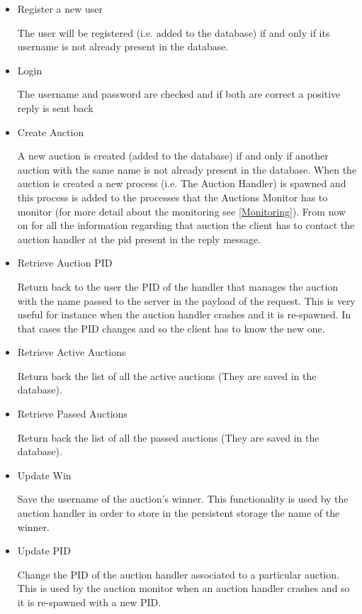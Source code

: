 \begin{itemize}
	\item Register a new user
	
	\noindent The user will be registered (i.e. added to the database) if and only if its username is not already present in the database.
	
	\item Login
	
	\noindent The username and password are checked and if both are correct a positive reply is sent back
	
	\item Create Auction
	
	\noindent A new auction is created (added to the database) if and only if another auction with the same name is not already present in the database. When the auction is created a new process (i.e. The Auction Handler) is spawned and this process is added to the processes that the Auctions Monitor has to monitor (for more detail about the monitoring see \ref{Monitoring}).
	From now on for all the information regarding that auction the client has to contact the auction handler at the pid present in the reply message.
	
	\item Retrieve Auction PID
	
	\noindent Return back to the user the PID of the handler that manages the auction with the name passed to the server in the payload of the request. This is very useful for instance when the auction handler crashes and it is re-spawned. In that cases the PID changes and so the client has to know the new one.
	
	\item Retrieve Active Auctions
	
	\noindent Return back the list of all the active auctions (They are saved in the database).
	
	\item Retrieve Passed Auctions
	
	\noindent Return back the list of all the passed auctions (They are saved in the database).
	
	\item Update Win
	
	\noindent Save the username of the auction's winner. This functionality is used by the auction handler in order to store in the persistent storage the name of the winner.
	
	\item Update PID
	
	\noindent Change the PID of the auction handler associated to a particular auction. This is used by the auction monitor when an auction handler crashes and so it is re-spawned with a new PID.
\end{itemize}


